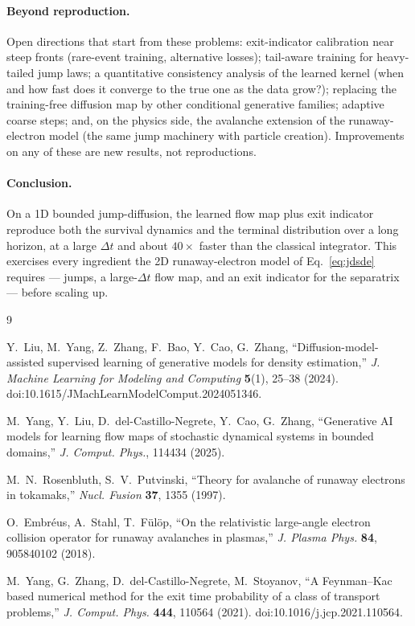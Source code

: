 \documentclass[11pt]{article}
\begin{document}
\paragraph{Beyond reproduction.} Open directions that start from these
problems: exit-indicator calibration near steep fronts (rare-event
training, alternative losses); tail-aware training for heavy-tailed jump
laws; a quantitative consistency analysis of the learned kernel (when and
how fast does it converge to the true one as the data grow?); replacing
the training-free diffusion map by other conditional generative families;
adaptive coarse steps; and, on the physics side, the avalanche extension
of the runaway-electron model (the same jump machinery with particle
creation). Improvements on any of these are new results, not
reproductions.




\paragraph{Conclusion.} On a 1D bounded jump-diffusion, the learned flow map plus
exit indicator reproduce both the survival dynamics and the terminal distribution
over a long horizon, at a large $\Delta t$ and about $40\times$ faster than the
classical integrator. This exercises every ingredient the 2D runaway-electron
model of Eq.~\eqref{eq:jdsde} requires --- jumps, a large-$\Delta t$ flow map, and
an exit indicator for the separatrix --- before scaling up.

\begin{thebibliography}{9}

 Y.~Liu, M.~Yang, Z.~Zhang, F.~Bao, Y.~Cao, G.~Zhang,
``Diffusion-model-assisted supervised learning of generative models for density
estimation,'' \textit{J. Machine Learning for Modeling and Computing}
\textbf{5}(1), 25--38 (2024). doi:10.1615/JMachLearnModelComput.2024051346.

 M.~Yang, Y.~Liu, D.~del-Castillo-Negrete, Y.~Cao, G.~Zhang,
``Generative AI models for learning flow maps of stochastic dynamical systems in
bounded domains,'' \textit{J. Comput. Phys.}, 114434 (2025).

 M.~N.~Rosenbluth, S.~V.~Putvinski,
``Theory for avalanche of runaway electrons in tokamaks,''
\textit{Nucl. Fusion} \textbf{37}, 1355 (1997).

 O.~Embr\'eus, A.~Stahl, T.~F\"ul\"op,
``On the relativistic large-angle electron collision operator for runaway
avalanches in plasmas,'' \textit{J. Plasma Phys.} \textbf{84}, 905840102 (2018).

 M.~Yang, G.~Zhang, D.~del-Castillo-Negrete,
M.~Stoyanov, ``A Feynman--Kac based numerical method for the exit time
probability of a class of transport problems,'' \textit{J. Comput. Phys.}
\textbf{444}, 110564 (2021). doi:10.1016/j.jcp.2021.110564.

\end{thebibliography}
\end{document}
